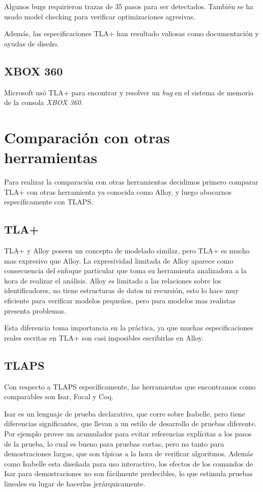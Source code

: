 \documentclass[spanish]{llncs}
\begin{document}
Algunos bugs requirieron trazas de 35 pasos para ser detectados. También se ha usado model checking para verificar optimizaciones agresivas.

Además, las especificaciones TLA+ han resultado valiosas como documentación y ayudas de diseño.
\cite{amazon}

\subsection{XBOX 360}
Microsoft usó TLA+ para encontrar y resolver un \textit{bug} en el sistema de memoria de la consola \textit{XBOX 360}.
\cite{xbox360}


\section{Comparación con otras herramientas}
Para realizar la comparación con otras herramientas decidimos primero comparar TLA+ con otras herramienta ya conocida como Alloy,
y luego abocarnos específicamente con TLAPS.

  \subsection{TLA+}
  TLA+ y Alloy poseen un concepto de modelado similar, pero TLA+ es mucho mas expresivo que Alloy. La expresividad limitada de Alloy aparece como consecuencia del enfoque particular
  que toma su herramienta analizadora a la  hora de realizar el análisis. Alloy es limitado a las relaciones sobre los identificadores, no tiene estructuras de datos ni recursión, 
  esto lo hace muy eficiente para verificar modelos pequeños, pero para modelos mas realistas presenta problemas. 
  
  Esta diferencia toma importancia en la práctica, ya que muchas especificaciones reales escritas en TLA+ son 
  casi imposibles escribirlas en Alloy. 

  \subsection{TLAPS}
  Con respecto a TLAPS específicamente, las herramientas que encontramos como comparables son Isar, Focal y Coq.

  Isar es un lenguaje de prueba declarativo, que corre sobre Isabelle, pero tiene diferencias significantes, que llevan a un estilo de desarrollo de pruebas diferente. 
  Por ejemplo provee un acumulador para evitar referencias explícitas a los pasos de la prueba, lo cual es bueno para pruebas cortas, pero no tanto para demostraciones largas,
  que son típicas a la hora de verificar algoritmos. Además como Isabelle esta diseñada para uso interactivo, los efectos de los comandos de Isar para demostraciones no son fácilmente 
  predecibles, lo que estimula pruebas lineales en lugar de hacerlas jerárquicamente. 
\end{document}
